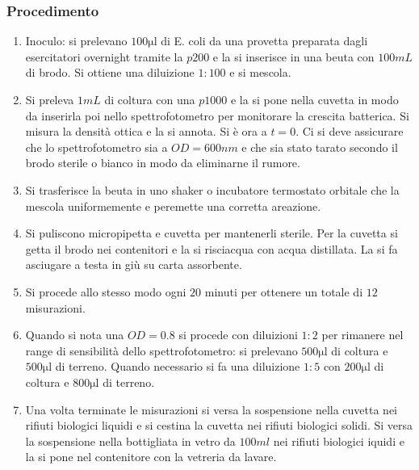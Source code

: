 		\subsubsection{Procedimento}
		\begin{enumerate}
			\item Inoculo: si prelevano $100\si{\micro\litre}$ di E. coli da una provetta preparata dagli esercitatori overnight tramite la $p200$ e la si inserisce in una beuta con $100\si{mL}$ di brodo.
				Si ottiene una diluizione $1:100$ e si mescola.
			\item Si preleva $1\si{mL}$ di coltura con una $p1000$ e la si pone nella cuvetta in modo da inserirla poi nello spettrofotometro per monitorare la crescita batterica.
				Si misura la densit\`a ottica e la si annota. Si \`e ora a $t=0$.
				Ci si deve assicurare che lo spettrofotometro sia a $OD=600\si{nm}$ e che sia stato tarato secondo il brodo sterile o bianco in modo da eliminarne il rumore.
			\item Si trasferisce la beuta in uno shaker o incubatore termostato orbitale che la mescola uniformemente e peremette una corretta areazione.
			\item Si puliscono micropipetta e cuvetta per mantenerli sterile.
				Per la cuvetta si getta il brodo nei contenitori e la si risciacqua con acqua distillata.
				La si fa asciugare a testa in giù su carta assorbente.
			\item Si procede allo stesso modo ogni $20$ minuti per ottenere un totale di $12$ misurazioni.
			\item Quando si nota una $OD=0.8$ si procede con diluizioni $1:2$ per rimanere nel range di sensibilit\`a dello spettrofotometro: si prelevano $500\si{\micro\litre}$ di coltura e $500\si{\micro\litre}$ di terreno.
				Quando necessario si fa una diluizione $1:5$ con $200\si{\micro\litre}$ di coltura e $800\si{\micro\litre}$ di terreno.
			\item Una volta terminate le misurazioni si versa la sospensione nella cuvetta nei rifiuti biologici liquidi e si cestina la cuvetta nei rifiuti biologici solidi.
				Si versa la sospensione nella bottigliata in vetro da $100\si{ml}$ nei rifiuti biologici iquidi e la si pone nel contenitore con la vetreria da lavare.
		\end{enumerate}

